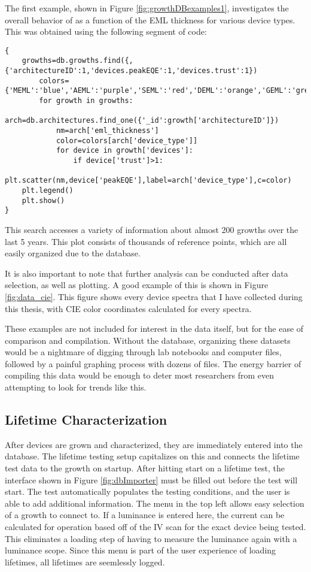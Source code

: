 \documentclass[../thesis.tex]{subfiles}
\begin{document}
The first example, shown in Figure \ref{fig:growthDBexamples1}, investigates the overall behavior of \eqe as a function of the EML thickness for various device types.
This was obtained using the following segment of code:

\begin{lstlisting}
{
    growths=db.growths.find({,{'architectureID':1,'devices.peakEQE':1,'devices.trust':1})
        colors={'MEML':'blue','AEML':'purple','SEML':'red','DEML':'orange','GEML':'green'}
        for growth in growths:
            arch=db.architectures.find_one({'_id':growth['architectureID']})
            nm=arch['eml_thickness']
            color=colors[arch['device_type']]
            for device in growth['devices']:
                if device['trust']>1:
                    plt.scatter(nm,device['peakEQE'],label=arch['device_type'],c=color)
    plt.legend()
    plt.show()
}
\end{lstlisting}

This search accesses a variety of information about almost 200 growths over the last 5 years.
This plot consists of thousands of reference points, which are all easily organized due to the database.

It is also important to note that further analysis can be conducted after data selection, as well as plotting.
A good example of this is shown in Figure \ref{fig:data_cie}.
This figure shows every device spectra that I have collected during this thesis, with CIE color coordinates calculated for every spectra.

These examples are not included for interest in the data itself, but for the ease of comparison and compilation.
Without the database, organizing these datasets would be a nightmare of digging through lab notebooks and computer files, followed by a painful graphing process with dozens of files.
The energy barrier of compiling this data would be enough to deter most researchers from even attempting to look for trends like this.

\subsection{Lifetime Characterization}

After devices are grown and characterized, they are immediately entered into the database.  
The lifetime testing setup capitalizes on this and connects the lifetime test data to the growth on startup.
After hitting start on a lifetime test, the interface shown in Figure \ref{fig:dbImporter} must be filled out before the test will start.  
The test automatically populates the testing conditions, and the user is able to add additional information.
The menu in the top left allows easy selection of a growth to connect to.  
If a luminance is entered here, the current can be calculated for operation based off of the IV scan for the exact device being tested.
This eliminates a loading step of having to measure the luminance again with a luminance scope.
Since this menu is part of the user experience of loading lifetimes, all lifetimes are seemlessly logged.
\end{document}
